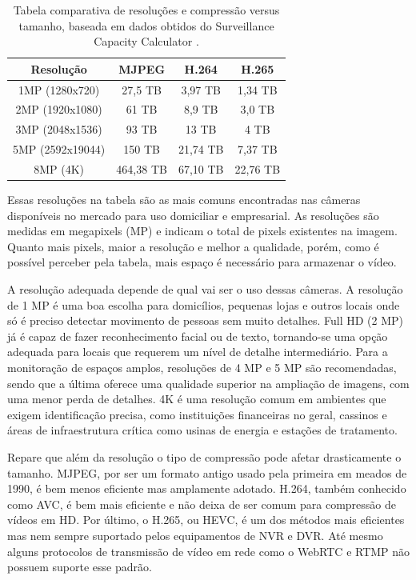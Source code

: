 \documentclass[12pt, %
openright, 
oneside, %
a4paper,    %
brazil]{facom-ufu-abntex2}
\begin{document}
\begin{table}[ht]
	\centering
	\begin{tabular}{|c|c|c|c|}
		\hline
		Resolução         & MJPEG     & H.264    & H.265    \\ \hline
		1MP (1280x720)    & 27,5 TB   & 3,97 TB  & 1,34 TB  \\ \hline
		2MP  (1920x1080)  & 61 TB     & 8,9 TB   & 3,0 TB   \\ \hline
		3MP  (2048x1536)  & 93 TB     & 13 TB    & 4 TB     \\ \hline
		5MP  (2592x19044) & 150 TB    & 21,74 TB & 7,37 TB  \\ \hline
		8MP  (4K)         & 464,38 TB & 67,10 TB & 22,76 TB \\ \hline

	\end{tabular}
	\caption{Tabela comparativa de resoluções e compressão versus tamanho, baseada em dados obtidos do Surveillance Capacity Calculator \cite{surveillancecalculator}.}
	\label{table:example}
\end{table}

Essas resoluções na tabela são as mais comuns encontradas nas câmeras
disponíveis no mercado para uso domiciliar e empresarial. As resoluções são
medidas em megapixels (MP) e indicam o total de pixels existentes na imagem.
Quanto mais pixels, maior a resolução e melhor a qualidade, porém, como é
possível perceber pela tabela, mais espaço é necessário para armazenar o vídeo.

A resolução adequada depende de qual vai ser o uso dessas câmeras. A resolução
de 1 MP é uma boa escolha para domicílios, pequenas lojas e outros locais onde
só é preciso detectar movimento de pessoas sem muito detalhes. Full HD (2 MP)
já é capaz de fazer reconhecimento facial ou de texto, tornando-se uma opção
adequada para locais que requerem um nível de detalhe intermediário. Para a
monitoração de espaços amplos, resoluções de 4 MP e 5 MP são recomendadas,
sendo que a última oferece uma qualidade superior na ampliação de imagens, com
uma menor perda de detalhes. 4K é uma resolução comum em ambientes que exigem
identificação precisa, como instituições financeiras no geral, cassinos e áreas
de infraestrutura crítica como usinas de energia e estações de tratamento.

Repare que além da resolução o tipo de compressão pode afetar drasticamente o
tamanho. MJPEG, por ser um formato antigo usado pela primeira em meados de
1990, é bem menos eficiente mas amplamente adotado. H.264, também conhecido
como AVC, é bem mais eficiente e não deixa de ser comum para compressão de
vídeos em HD. Por último, o H.265, ou HEVC, é um dos métodos mais eficientes
mas nem sempre suportado pelos equipamentos de NVR e DVR. Até mesmo alguns
protocolos de transmissão de vídeo em rede como o WebRTC e RTMP não possuem
suporte esse padrão.
\end{document}
